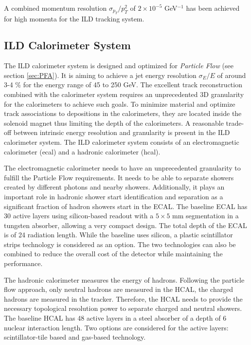 A combined momentum resolution $\sigma_{p_T}/p_T^2$ of $2 \times 10^{-5}$ GeV$^{-1}$ has been achieved for high momenta for the ILD tracking system.

\subsection{ILD Calorimeter System}

The ILD calorimeter system is designed and optimized for \textit{Particle Flow} (see section \ref{sec:PFA}). It is aiming to achieve a jet energy resolution $\sigma_E/E$ of around 3-4 \% for the energy range of 45 to 250 GeV. The excellent track reconstruction combined with the calorimeter system requires an unprecedented 3D granularity for the calorimeters to achieve such goals. To minimize material and optimize track associations to depositions in the calorimeters, they are located inside the solenoid magnet thus limiting the depth of the calorimeters. A reasonable trade-off between intrinsic energy resolution and granularity is present in the ILD calorimeter system. The ILD calorimeter system consists of an electromagnetic calorimeter (\acrshort{ecal}) and a hadronic calorimeter (\acrshort{hcal}).

The electromagnetic calorimeter needs to have an unprecedented granularity to fulfill the Particle Flow requirements. It needs to be able to separate showers created by different photons and nearby showers. Additionally, it plays an important role in hadronic shower start identification and separation as a significant fraction of hadron showers start in the ECAL. The baseline ECAL has 30 active layers using silicon-bas\-ed readout with a $5 \times 5$ mm segmentation in a tungsten absorber, allowing a very compact design. The total depth of the ECAL is of 24 radiation length. While the baseline uses silicon, a plastic scintillator strips technology is considered as an option. The two technologies can also be combined to reduce the overall cost of the detector while maintaining the performance.

The hadronic calorimeter measures the energy of hadrons. Following the particle flow approach, only neutral hadrons are measured in the HCAL, the charged hadrons are measured in the tracker. Therefore, the HCAL needs to provide the necessary topological resolution power to separate charged and neutral showers. The baseline HCAL has 48 active layers in a steel absorber of a depth of 6 nuclear interaction length. Two options are considered for the active layers: scintillator-tile based and gas-based technology.

